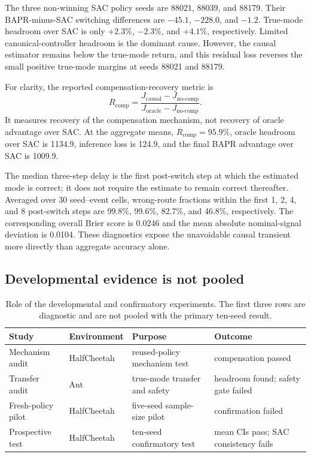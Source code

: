 The three non-winning SAC policy seeds are 88021, 88039, and 88179. Their BAPR-minus-SAC switching differences are $-45.1$, $-228.0$, and $-1.2$. True-mode headroom over SAC is only $+2.3\%$, $-2.3\%$, and $+4.1\%$, respectively. Limited canonical-controller headroom is the dominant cause. However, the causal estimator remains below the true-mode return, and this residual loss reverses the small positive true-mode margins at seeds 88021 and 88179.

For clarity, the reported compensation-recovery metric is
\begin{equation}
 R_{\mathrm{comp}}=
 \frac{J_{\mathrm{causal}}-J_{\mathrm{no\text{-}comp}}}
 {J_{\mathrm{oracle}}-J_{\mathrm{no\text{-}comp}}}.
\end{equation}
It measures recovery of the compensation mechanism, not recovery of oracle advantage over SAC. At the aggregate means, $R_{\mathrm{comp}}=95.9\%$, oracle headroom over SAC is 1134.9, inference loss is 124.9, and the final BAPR advantage over SAC is 1009.9.

The median three-step delay is the first post-switch step at which the estimated mode is correct; it does not require the estimate to remain correct thereafter. Averaged over 30 seed--event cells, wrong-route fractions within the first 1, 2, 4, and 8 post-switch steps are 99.8\%, 99.6\%, 82.7\%, and 46.8\%, respectively. The corresponding overall Brier score is 0.0246 and the mean absolute nominal-signal deviation is 0.0104. These diagnostics expose the unavoidable causal transient more directly than aggregate accuracy alone.

\subsection{Developmental evidence is not pooled}

\begin{table}[ht]
\centering
\caption{Role of the developmental and confirmatory experiments. The first three rows are diagnostic and are not pooled with the primary ten-seed result.}
\label{tab:development_history}
\small
\begin{tabular}{@{}p{}p{}p{}p{}@{}}
\toprule
Study & Environment & Purpose & Outcome \\
\midrule
Mechanism audit & HalfCheetah & reused-policy mechanism test & compensation passed \\
Transfer audit & Ant & true-mode transfer and safety & headroom found; safety gate failed \\
Fresh-policy pilot & HalfCheetah & five-seed sample-size pilot & confirmation failed \\
Prospective test & HalfCheetah & ten-seed confirmatory test & mean CIs pass; SAC consistency fails \\
\bottomrule
\end{tabular}
\end{table}

